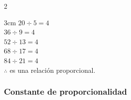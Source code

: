 {\begin{multicols}{2}
\begin{parts}
                \begin{solutionbox}{3cm}
                    $20\div  5=4$\\[-0.2em]
                    $36\div  9=4$\\[-0.2em]
                    $52\div 13=4$\\[-0.2em]
                    $68\div 17=4$\\[-0.2em]
                    $84\div 21=4$\\[-0.2em]
                    $\therefore$ es una relación proporcional.
                \end{solutionbox}

            \end{parts}
        \end{multicols}
    }
    \subsubsection{Constante de proporcionalidad}
